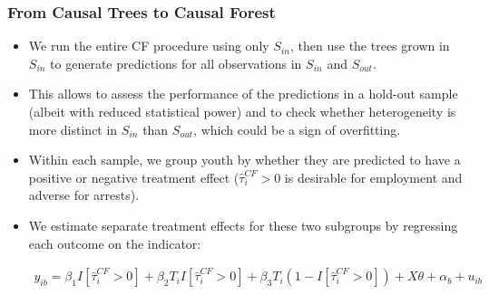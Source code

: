 \documentclass[
  shownotes,
  xcolor={svgnames},
  hyperref={colorlinks,citecolor=DarkBlue,linkcolor=DarkRed,urlcolor=DarkBlue}
  , aspectratio=169]{beamer}
\begin{document}
\begin{frame}[fragile]
\frametitle{From Causal Trees to Causal Forest}

\begin{itemize}


\item We run the entire CF procedure using only $S_{in}$, then use the trees grown in  $S_{in}$ to generate predictions for all observations in  $S_{in}$ and  $S_{out}$.
\medskip
 \item This allows  to assess the performance of the predictions in a hold-out sample (albeit with reduced statistical power) and to check whether heterogeneity is more distinct in  $S_{in}$ than  $S_{out}$, which could be a sign of overfitting.
 \item 
Within each sample, we group youth by whether they are predicted to have a positive or negative treatment effect ($\hat{\tau}^{CF}_i>0$ is desirable for employment and adverse for arrests).
\item  We estimate separate treatment effects for these two subgroups by regressing each outcome on the indicator:

\begin{align}
y_{ib} = \beta_1 I[\hat{\tau}^{CF}_i>0] + \beta_2 T_i I[\hat{\tau}^{CF}_i>0] + \beta_3 T_i \left(1-I[\hat{\tau}^{CF}_i>0] \right)+ X\theta + \alpha_b + u_{ib}
\end{align}

\end{itemize}
\end{frame}
\end{document}
